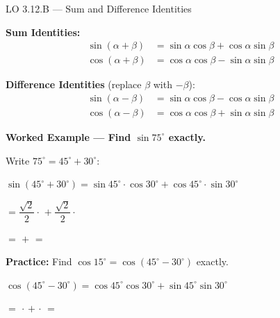 \documentclass[10pt]{article}
\begin{document}
\vspace{0.08in}

\begin{notesbox}{LO 3.12.B --- Sum and Difference Identities}

\textbf{Sum Identities:}
\begin{align*}
\sin(\alpha + \beta) &= \sin\alpha\cos\beta + \cos\alpha\sin\beta \\
\cos(\alpha + \beta) &= \cos\alpha\cos\beta - \sin\alpha\sin\beta
\end{align*}

\textbf{Difference Identities} (replace $\beta$ with $-\beta$):
\begin{align*}
\sin(\alpha - \beta) &= \sin\alpha\cos\beta - \cos\alpha\sin\beta \\
\cos(\alpha - \beta) &= \cos\alpha\cos\beta + \sin\alpha\sin\beta
\end{align*}

\vspace{4pt}
\textbf{Worked Example --- Find $\sin 75^\circ$ exactly.}

Write $75^\circ = 45^\circ + 30^\circ$:

\vspace{4pt}
$\sin(45^\circ + 30^\circ)
= \sin 45^\circ \cdot \cos 30^\circ + \cos 45^\circ \cdot \sin 30^\circ$

\vspace{4pt}
$= \dfrac{\sqrt{2}}{2}\cdot$ \underline{\hspace{1.6cm}}
$+\; \dfrac{\sqrt{2}}{2}\cdot$ \underline{\hspace{1.6cm}}

\vspace{4pt}
$= $ \underline{\hspace{1.8cm}} $+$ \underline{\hspace{1.8cm}} $= $ \underline{\hspace{2.5cm}}

\vspace{8pt}
\textbf{Practice:} Find $\cos 15^\circ = \cos(45^\circ - 30^\circ)$ exactly.

\vspace{4pt}
$\cos(45^\circ - 30^\circ)
= \cos 45^\circ \cos 30^\circ + \sin 45^\circ \sin 30^\circ$

\vspace{4pt}
$=$ \underline{\hspace{1.6cm}} $\cdot$ \underline{\hspace{1.6cm}}
$+$ \underline{\hspace{1.6cm}} $\cdot$ \underline{\hspace{1.6cm}}
$= $ \underline{\hspace{2.5cm}}

\end{notesbox}
\end{document}

